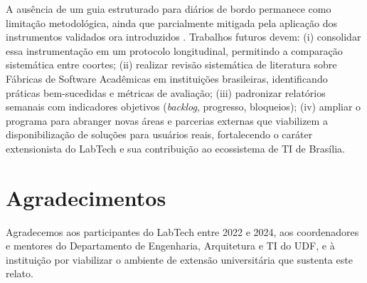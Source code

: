 \documentclass[12pt,a4paper]{article}
\begin{document}
A aus\^encia de um guia estruturado para di\'arios de bordo permanece
como limita\c{c}\~ao metodol\'ogica, ainda que parcialmente mitigada pela
aplica\c{c}\~ao dos instrumentos validados ora introduzidos
\cite{bacigalupo2016entrecomp,sherer1982gse}. Trabalhos futuros devem:
(i) consolidar essa instrumenta\c{c}\~ao em um protocolo longitudinal,
permitindo a compara\c{c}\~ao sistem\'atica entre coortes; (ii) realizar
revis\~ao sistem\'atica de literatura sobre F\'abricas de Software
Acad\^emicas em institui\c{c}\~oes brasileiras, identificando pr\'aticas
bem-sucedidas e m\'etricas de avalia\c{c}\~ao; (iii) padronizar
relat\'orios semanais com indicadores objetivos (\emph{backlog},
progresso, bloqueios); (iv) ampliar o programa para abranger novas
\'areas e parcerias externas que viabilizem a disponibiliza\c{c}\~ao de
solu\c{c}\~oes para usu\'arios reais, fortalecendo o car\'ater
extensionista do LabTech e sua contribui\c{c}\~ao ao ecossistema de TI
de Bras\'ilia.

\section*{Agradecimentos}
Agradecemos aos participantes do LabTech entre 2022 e 2024, aos
coordenadores e mentores do Departamento de Engenharia, Arquitetura e TI
do UDF, e \`a institui\c{c}\~ao por viabilizar o ambiente de extens\~ao
universit\'aria que sustenta este relato.

\begin{singlespace}

\end{singlespace}
\end{document}
